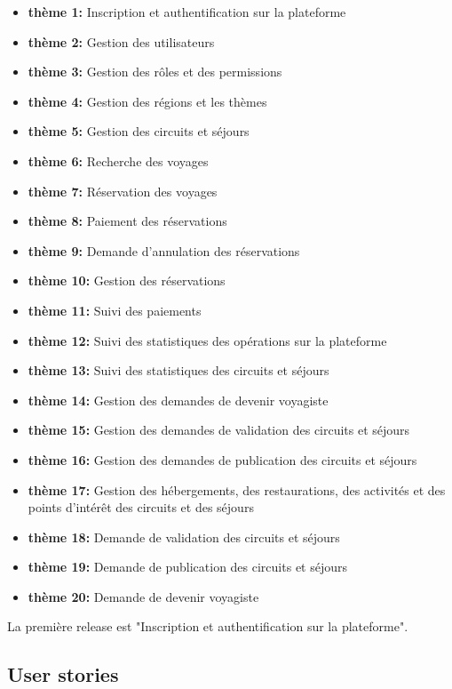 \documentclass[12pt]{report}
\begin{document}
				\begin{itemize}
					\item \textbf{thème 1:} Inscription et authentification sur la plateforme
					\item \textbf{thème 2:} Gestion des utilisateurs
					\item \textbf{thème 3:} Gestion des rôles et des permissions
					\item \textbf{thème 4:} Gestion des régions et les thèmes
					\item \textbf{thème 5:} Gestion des circuits et séjours
					\item \textbf{thème 6:} Recherche des voyages
					\item \textbf{thème 7:} Réservation des voyages
					\item \textbf{thème 8:} Paiement des réservations
					\item \textbf{thème 9:} Demande d'annulation des réservations
					\item \textbf{thème 10:} Gestion des réservations
					\item \textbf{thème 11:} Suivi des paiements
					\item \textbf{thème 12:} Suivi des statistiques des opérations sur la plateforme
					\item \textbf{thème 13:} Suivi des statistiques des circuits et séjours
					\item \textbf{thème 14:} Gestion des demandes de devenir voyagiste
					\item \textbf{thème 15:} Gestion des demandes de validation des circuits et séjours
					\item \textbf{thème 16:} Gestion des demandes de publication des circuits et séjours
					\item \textbf{thème 17:} Gestion des hébergements, des restaurations, des activités et des points d'intérêt des circuits et des séjours
					\item \textbf{thème 18:} Demande de validation des circuits et séjours
					\item \textbf{thème 19:} Demande de publication des circuits et séjours
					\item \textbf{thème 20:} Demande de devenir voyagiste
				\end{itemize}

				La première release est "Inscription et authentification sur la plateforme".

				\subsection{User stories}
\end{document}
